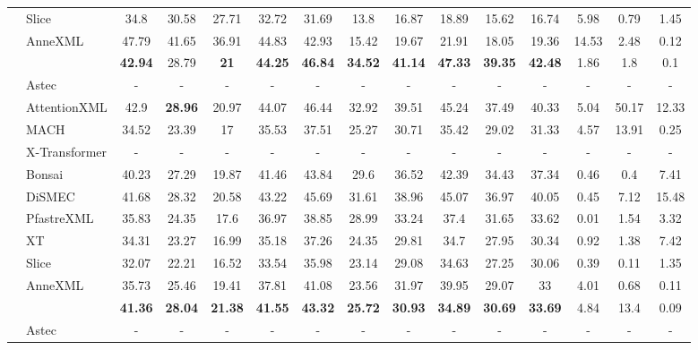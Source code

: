 \begin{table*}
{\begin{tabular}{@{}c|l|ccccc|ccccc|ccc@{}}
	& Slice	 & 34.8	 & 30.58	 & 27.71	 & 32.72	 & 31.69	 & 13.8	 & 16.87	 & 18.89	 & 15.62	 & 16.74	 & 5.98	 & 0.79	 & 1.45\\
	& AnneXML	 & 47.79	 & 41.65	 & 36.91	 & 44.83	 & 42.93	 & 15.42	 & 19.67	 & 21.91	 & 18.05	 & 19.36	 & 14.53	 & 2.48	 & 0.12\\
	\midrule
	\multirow{11}{*}{\textbf{\rotatebox{90}{LF-Amazon-131K}}}	& \alg	 & \textbf{42.94}	 & 28.79	 & \textbf{21}	 & \textbf{44.25}	 & \textbf{46.84}	 & \textbf{34.52}	 & \textbf{41.14}	 & \textbf{47.33}	 & \textbf{39.35}	 & \textbf{42.48}	 & 1.86	 & 1.8	 & 0.1\\
	& Astec	 & -	 & -	 & -	 & -	 & -	 & -	 & -	 & -	 & -	 & -	 & -	 & -	 & -\\
	& AttentionXML	 & 42.9	 & \textbf{28.96}	 & 20.97	 & 44.07	 & 46.44	 & 32.92	 & 39.51	 & 45.24	 & 37.49	 & 40.33	 & 5.04	 & 50.17	 & 12.33\\
	& MACH	 & 34.52	 & 23.39	 & 17	 & 35.53	 & 37.51	 & 25.27	 & 30.71	 & 35.42	 & 29.02	 & 31.33	 & 4.57	 & 13.91	 & 0.25\\
	& X-Transformer	 & -	 & -	 & -	 & -	 & -	 & -	 & -	 & -	 & -	 & -	 & -	 & -	 & -\\
	& Bonsai	 & 40.23	 & 27.29	 & 19.87	 & 41.46	 & 43.84	 & 29.6	 & 36.52	 & 42.39	 & 34.43	 & 37.34	 & 0.46	 & 0.4	 & 7.41\\
	& DiSMEC	 & 41.68	 & 28.32	 & 20.58	 & 43.22	 & 45.69	 & 31.61	 & 38.96	 & 45.07	 & 36.97	 & 40.05	 & 0.45	 & 7.12	 & 15.48\\
	& PfastreXML	 & 35.83	 & 24.35	 & 17.6	 & 36.97	 & 38.85	 & 28.99	 & 33.24	 & 37.4	 & 31.65	 & 33.62	 & 0.01	 & 1.54	 & 3.32\\
	& XT	 & 34.31	 & 23.27	 & 16.99	 & 35.18	 & 37.26	 & 24.35	 & 29.81	 & 34.7	 & 27.95	 & 30.34	 & 0.92	 & 1.38	 & 7.42\\
	& Slice	 & 32.07	 & 22.21	 & 16.52	 & 33.54	 & 35.98	 & 23.14	 & 29.08	 & 34.63	 & 27.25	 & 30.06	 & 0.39	 & 0.11	 & 1.35\\
	& AnneXML	 & 35.73	 & 25.46	 & 19.41	 & 37.81	 & 41.08	 & 23.56	 & 31.97	 & 39.95	 & 29.07	 & 33	 & 4.01	 & 0.68	 & 0.11\\
	 \midrule
	 \multirow{11}{*}{\textbf{\rotatebox{90}{LF-WikiSeeAlso-320K}}}	& \alg	 & \textbf{41.36}	 & \textbf{28.04}	 & \textbf{21.38}	 & \textbf{41.55}	 & \textbf{43.32}	 & \textbf{25.72}	 & \textbf{30.93}	 & \textbf{34.89}	 & \textbf{30.69}	 & \textbf{33.69}	 & 4.84	 & 13.4	 & 0.09\\
	& Astec	 & -	 & -	 & -	 & -	 & -	 & -	 & -	 & -	 & -	 & -	 & -	 & -	 & -\\

\end{tabular}}
\end{table*}
